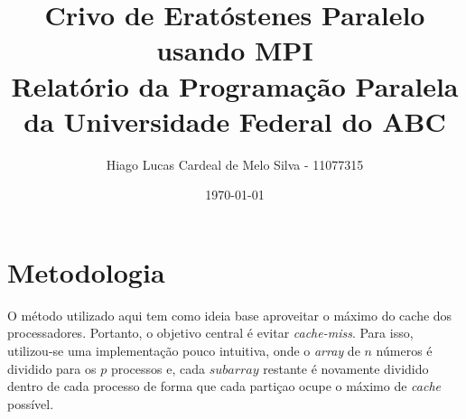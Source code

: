 \documentclass[a4paper, 12 pt]{article}
\begin{document}
\title{
  Crivo de Eratóstenes Paralelo usando MPI \\
  \large Relatório da Programação Paralela da Universidade Federal do ABC}
\author{Hiago Lucas Cardeal de Melo Silva - 11077315}
\date{\today}
\maketitle

\section{Metodologia}

O método utilizado aqui tem como ideia base aproveitar o máximo do cache dos processadores. Portanto,
o objetivo central é evitar \textit{cache-miss}. Para isso, utilizou-se uma implementação pouco intuitiva, 
onde o \textit{array} de $n$ números é dividido para os $p$ processos e, cada $subarray$ restante é novamente dividido dentro de cada processo
de forma que cada partiçao ocupe o máximo de \textit{cache} possível.
\end{document}
